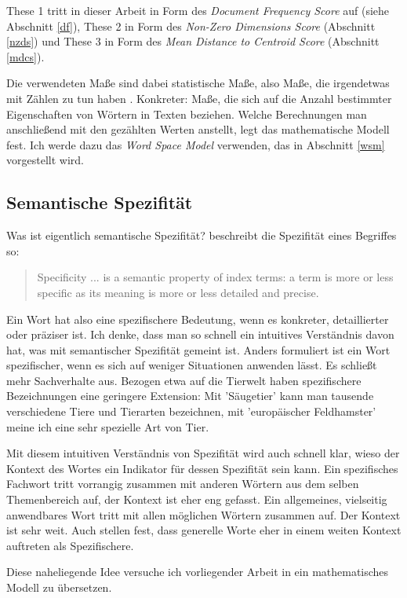 \documentclass[11pt,numbers=noenddot]{scrartcl}
\begin{document}
These 1 tritt in dieser Arbeit in Form des \emph{Document Frequency Score} auf (siehe Abschnitt \ref{df}), These 2 in Form des \emph{Non-Zero Dimensions Score} (Abschnitt \ref{nzds}) und These 3 in Form des \emph{Mean Distance to Centroid Score} (Abschnitt \ref{mdcs}).

Die verwendeten Maße sind dabei statistische Maße, also Maße, die irgendetwas mit Zählen zu tun haben \citep[S. 4]{manning1999}. Konkreter: Maße, die sich auf die Anzahl bestimmter Eigenschaften von Wörtern in Texten beziehen. Welche Berechnungen man anschließend mit den gezählten Werten anstellt, legt das mathematische Modell fest. Ich werde dazu das \emph{Word Space Model} verwenden, das in Abschnitt \ref{wsm} vorgestellt wird.

\subsection*{Semantische Spezifität}
Was ist eigentlich semantische Spezifität? \citet[S. 11]{sparckjones1972} beschreibt die Spezifität eines Begriffes so:
\begin{quote}
  Specificity ... is a semantic property of index terms: a term is more or less specific as its meaning is more or less detailed and precise.
\end{quote}

Ein Wort hat also eine spezifischere Bedeutung, wenn es konkreter, detaillierter oder präziser ist. Ich denke, dass man so schnell ein intuitives Verständnis davon hat, was mit semantischer Spezifität gemeint ist. Anders formuliert ist ein Wort spezifischer, wenn es sich auf weniger Situationen anwenden lässt. Es schließt mehr Sachverhalte aus. Bezogen etwa auf die Tierwelt haben spezifischere Bezeichnungen eine geringere Extension: Mit 'Säugetier' kann man tausende verschiedene Tiere und Tierarten bezeichnen, mit 'europäischer Feldhamster' meine ich eine sehr spezielle Art von Tier.

Mit diesem intuitiven Verständnis von Spezifität wird auch schnell klar, wieso der Kontext des Wortes ein Indikator für dessen Spezifität sein kann. Ein spezifisches Fachwort tritt vorrangig zusammen mit anderen Wörtern aus dem selben Themenbereich auf, der Kontext ist eher eng gefasst. Ein allgemeines, vielseitig anwendbares Wort tritt mit allen möglichen Wörtern zusammen auf. Der Kontext ist sehr weit. Auch \citet{weeds-weir-mccarthy} stellen fest, dass generelle Worte eher in einem weiten Kontext auftreten als Spezifischere.

Diese naheliegende Idee versuche ich vorliegender Arbeit in ein mathematisches Modell zu übersetzen.
\end{document}
